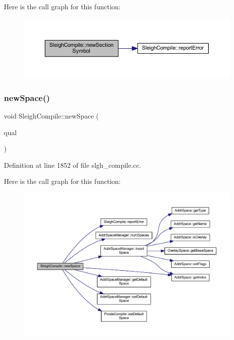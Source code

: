 Here is the call graph for this function\+:
\nopagebreak
\begin{figure}[H]
\begin{center}
\leavevmode
\includegraphics[width=350pt]{class_sleigh_compile_a1ba500a5fecf35e16b0721afa600e857_cgraph}
\end{center}
\end{figure}
\mbox{\label{class_sleigh_compile_afadd41c3c850e824d48ec7c2638304c8}} 
\subsubsection{\texorpdfstring{newSpace()}{newSpace()}}
{\footnotesize\ttfamily void Sleigh\+Compile\+::new\+Space (\begin{DoxyParamCaption}\item[{\mbox{\hyperlink{struct_space_quality}{Space\+Quality}} $\ast$}]{qual }\end{DoxyParamCaption})}



Definition at line 1852 of file slgh\+\_\+compile.\+cc.

Here is the call graph for this function\+:
\nopagebreak
\begin{figure}[H]
\begin{center}
\leavevmode
\includegraphics[width=350pt]{class_sleigh_compile_afadd41c3c850e824d48ec7c2638304c8_cgraph}
\end{center}
\end{figure}
\mbox{\label{class_sleigh_compile_a6a59f980ee7792e983275d1cb3913ba2}} 
